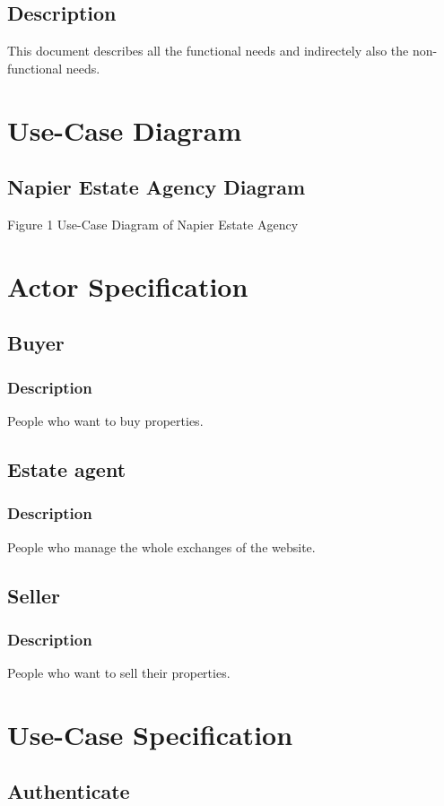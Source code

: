 \documentclass[a4paper,12pt]{article}
\begin{document}
\subsection{Description}
This document describes all the functional needs and indirectely also the non-functional needs.


\section{Use-Case Diagram}

\subsection{Napier Estate Agency Diagram}
Figure 1 Use-Case Diagram of Napier Estate Agency

\section{Actor Specification}

\subsection{Buyer}
\subsubsection{Description}
People who want to buy properties.
\subsection{Estate agent}
\subsubsection{Description}
People who manage the whole exchanges of the website.
\subsection{Seller}
\subsubsection{Description}
People who want to sell their properties.


\section{Use-Case Specification}

\subsection{Authenticate}
\end{document}
